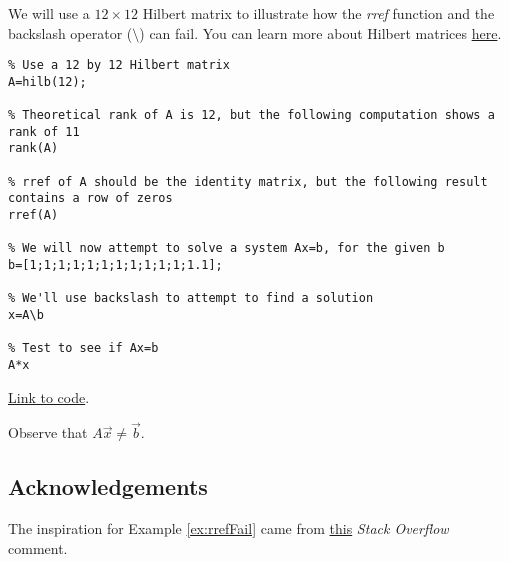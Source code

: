 \documentclass{ximera}
\begin{document}
\begin{example}\label{ex:rrefFail}
    We will use a $12\times 12$ Hilbert matrix to illustrate how the \emph{rref} function and the backslash operator ($\setminus$) can fail.  You can learn more about Hilbert matrices \href{https://en.wikipedia.org/wiki/Hilbert_matrix}{here}.

\begin{verbatim}
% Use a 12 by 12 Hilbert matrix
A=hilb(12);

% Theoretical rank of A is 12, but the following computation shows a rank of 11
rank(A)

% rref of A should be the identity matrix, but the following result contains a row of zeros
rref(A)

% We will now attempt to solve a system Ax=b, for the given b
b=[1;1;1;1;1;1;1;1;1;1;1;1.1];

% We'll use backslash to attempt to find a solution
x=A\b

% Test to see if Ax=b
A*x

\end{verbatim}

\href{https://sagecell.sagemath.org/?z=eJxtkbFuwyAQhnck3uGWqEkVVSJr5MFbH6BVh7YD2OcYBUMER2z36XvYSdUhQkLodHzf8bOB94SgQR3AzGV_tc5gJBg0RTtJUVc9V7bqsDtKIcUG3noMEck22kHU_gyhgxps4st7MJmAeoQuOBdG60_QhOGSSZMNHlIfxsSy-zWlpCjnbb1b2TFit_K4NbsWDC4426InS_NtqkeeiCk7Yp0nbf1iCWNh_WAMiT2M_vN8IIzWOfDcoolwuDAuQAruWsJIc-Ia1FNl9qyIi-pkr-jBSGGqT3V8uF7U9_EueGJ85miNbs7J6dQXwT9XZ31bVMHlko0UU1V_mVvEmNZ5kJ_eLXPwRzxPv6PhhhA=&lang=octave&interacts=eJyLjgUAARUAuQ==}{Link to code}.

Observe that $A\vec{x}\neq\vec{b}$. 
\end{example}

\subsection*{Acknowledgements}

The inspiration for Example \ref{ex:rrefFail} came from \href{https://stackoverflow.com/questions/42893111/matlab-rref-function-precision-error-after-12th-column-of-hilbert-matrices}{this} \emph{Stack Overflow} comment.

  
\end{document}
